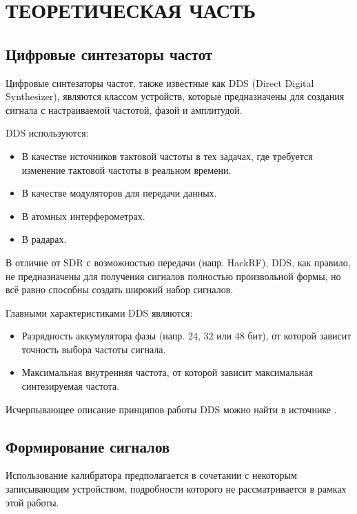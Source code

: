 \documentclass[rusmathsym, eqnumwithinsec, amspack, hyperref]{bomgost}
\begin{document}
\mainpart


\section{ТЕОРЕТИЧЕСКАЯ ЧАСТЬ}
\subsection{Цифровые синтезаторы частот}

Цифровые синтезаторы частот, также известные как DDS (Direct Digital Synthesizer), являются классом устройств, которые предназначены для создания сигнала с настраиваемой частотой, фазой и амплитудой.

DDS используются:

\begin{itemize}
	\item В качестве источников тактовой частоты в тех задачах, где требуется изменение тактовой частоты в реальном времени.
	\item В качестве модуляторов для передачи данных.
	\item В атомных интерферометрах.
	\item В радарах.
\end{itemize}

В отличие от SDR с возможностью передачи (напр. HackRF), DDS, как правило, не предназначены для получения сигналов полностью произвольной формы, но всё равно способны создать широкий набор сигналов.

Главными характеристиками DDS являются:

\begin{itemize}
	\item Разрядность аккумулятора фазы (напр. 24, 32 или 48 бит), от которой зависит точность выбора частоты сигнала.
	\item Максимальная внутренняя частота, от которой зависит максимальная синтезируемая частота.
\end{itemize}

Исчерпывающее описание принципов работы DDS можно найти в источнике \cite{DDSTutorial}.

\subsection{Формирование сигналов}

Использование калибратора предполагается в сочетании с некоторым записывающим устройством, подробности которого не рассматривается в рамках этой работы.
\end{document}
